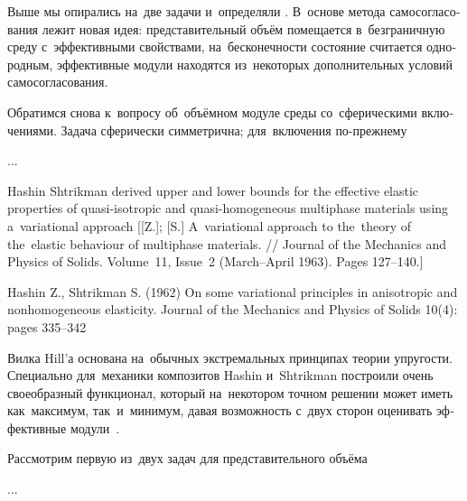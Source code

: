 \label{section:composites.selfconsistentmethod}

\begin{otherlanguage}{russian}

Выше мы опирались на~две задачи   и~определяли   .
В~основе метода самосогласования лежит новая идея: представительный объём помещается в~безграничную среду с~эффективными свойствами, на~бесконечности состояние считается однородным, эффективные модули находятся из~некоторых дополнительных условий самосогласования.

Обратимся снова к~вопросу об~объёмном модуле среды со~сферическими включениями.
Задача сферически симметрична; для~включения по\hbox{-}прежнему

...



\end{otherlanguage}



\label{section:composites.hashin-shtrikman-principle}

{\small
\noindent
Hashin  Shtrikman derived upper and lower bounds for the effective elastic properties of quasi-isotropic and quasi-homogeneous multiphase materials using a~variational approach [[Z.]; [S.] A~variational approach to the~theory of the~elastic behaviour of multiphase materials. // Journal of the Mechanics and Physics of Solids. Volume~11, Issue~2 (March--April 1963). Pages 127\hbox{--}140.]

Hashin Z., Shtrikman S. (1962) On some variational principles in anisotropic and nonhomogeneous elasticity. Journal of the Mechanics and Physics of Solids 10(4): pages 335–342
\par}

\begin{otherlanguage}{russian}

Вилка Hill’а основана на~обычных экстремальных принципах теории упругости.
Специально для~механики композитов Hashin и~Shtrikman построили очень своеобразный функционал, который на~некотором точном решении может иметь как~максимум, так~и~минимум, давая возможность с~двух сторон оценивать эффективные модули~\cite{shermergor}.

Рассмотрим первую из~двух задач для представительного объёма

...



\end{otherlanguage}

